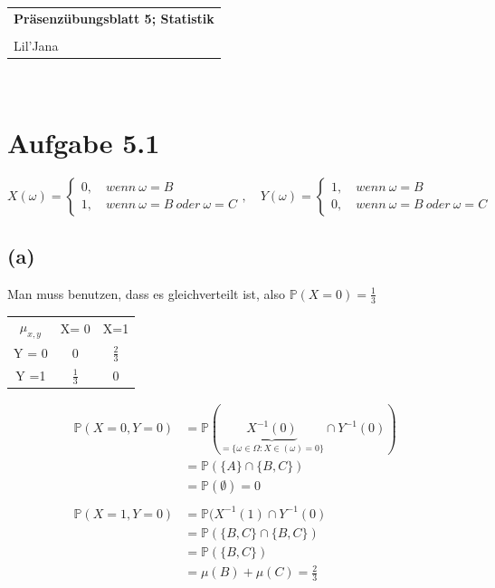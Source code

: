 \documentclass{article} %
\newcommand{\titulo}{Präsenzübungsblatt 5; Statistik}
\newcommand{\nombre}{Lil'Jana}
\newcommand{\p}[0]{\mathbb{P}}
\begin{document}
\begin{tabular}{p{12cm}}
{{\Large\bf\titulo}}\\
\vspace{0.2cm}\\
 {\large\nombre}\\
\end{tabular}
\vspace{0.2cm}\\
\section{Aufgabe 5.1}
\[
X(\omega) = 
\begin{cases}
0, \quad wenn\  \omega  =B \\
1, \quad wenn\  \omega  =B\ oder\ \omega = C
\end{cases}, \quad 
Y(\omega) = 
\begin{cases}
1, \quad wenn\  \omega  =B \\
0, \quad wenn\  \omega  =B\ oder\ \omega = C
\end{cases}
\]
\subsection*{(a)}
Man muss benutzen, dass es gleichverteilt ist, also $\mathbb{P}(X=0) = \frac{1}{3}$ 
\begin{table}[H]
    \centering
   \begin{tabular}{c|cc}
   $\mu_{x,y}$ & X= 0 & X=1 \\
    Y = 0 & 0 & $\frac{2}{3}$\\
    Y =1 & $\frac{1}{3}$ & 0
\end{tabular}
\end{table}
\caption{Plausibilitätscheck: Wenn wir alle Zellen summieren, sollte 1 raus kommen }
\begin{align*}
    \p(X=0, Y=0) &  = \p(\underbrace{X^{-1} (0)}_{=\{\omega \in \Omega: X \in (\omega) = 0\}} \cap Y ^{-1} (0))   \\
    & = \p (\{A\} \cap \{B,C\}) \\
    & = \p(\emptyset) = 0 \\ \\
    \p(X=1, Y = 0) & = \p (X^{-1}(1) \cap Y^{-1}(0) \\
    & = \p(\{B,C\} \cap \{B,C\})  \\
    & = \p(\{B,C\}) \\
    & = \mu(B) + \mu (C) = \frac{2}{3}
\end{align*}
\end{document}
